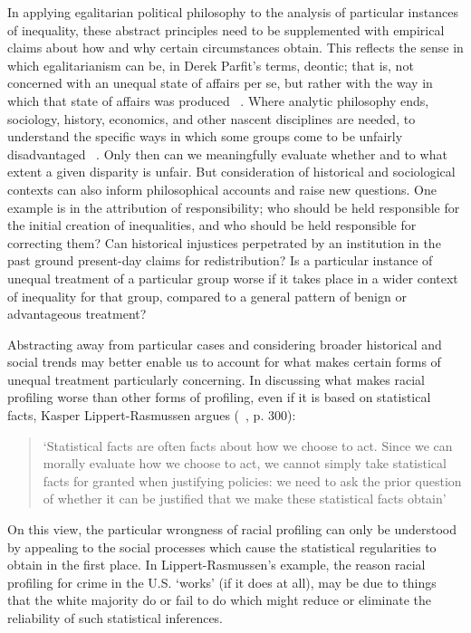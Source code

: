 \documentclass[pmlr,twocolumn,10pt]{jmlr}%
\begin{document}
In applying egalitarian political philosophy to the analysis of particular instances of inequality, these abstract principles need to be supplemented with empirical claims about how and why certain circumstances obtain. This reflects the sense in which egalitarianism can be, in Derek Parfit's terms, deontic; that is, not concerned with an unequal state of affairs per se, but rather with the way in which that state of affairs was produced ~\cite{parfit1997equality}. Where analytic philosophy ends, sociology, history, economics, and other nascent disciplines are needed, to understand the specific ways in which some groups come to be unfairly disadvantaged ~\cite{fang2010theories,hooks1992yearning}. Only then can we meaningfully evaluate whether and to what extent a given disparity is unfair. But consideration of historical and sociological contexts can also inform philosophical accounts and raise new questions. One example is in the attribution of responsibility; who should be held responsible for the initial creation of inequalities, and who should be held responsible for correcting them? Can historical injustices perpetrated by an institution in the past ground present-day claims for redistribution? Is a particular instance of unequal treatment of a particular group worse if it takes place in a wider context of inequality for that group, compared to a general pattern of benign or advantageous treatment?

Abstracting away from particular cases and considering broader historical and social trends may better enable us to account for what makes certain forms of unequal treatment particularly concerning. In discussing what makes racial profiling worse than other forms of profiling, even if it is based on statistical facts, Kasper Lippert-Rasmussen argues (~\cite{lippert2014born}, p. 300):
\begin{quote}
`Statistical facts are often facts about how we choose to act. Since we can morally evaluate how we choose to act, we cannot simply take statistical facts for granted when justifying policies: we need to ask the prior question of whether it can be justified that we make these statistical facts obtain'
\end{quote}
On this view, the particular wrongness of racial profiling can only be understood by appealing to the social processes which cause the statistical regularities to obtain in the first place. In Lippert-Rasmussen's example, the reason racial profiling for crime in the U.S. `works' (if it does at all), may be due to things that the white majority do or fail to do which might reduce or eliminate the reliability of such statistical inferences.
\end{document}
